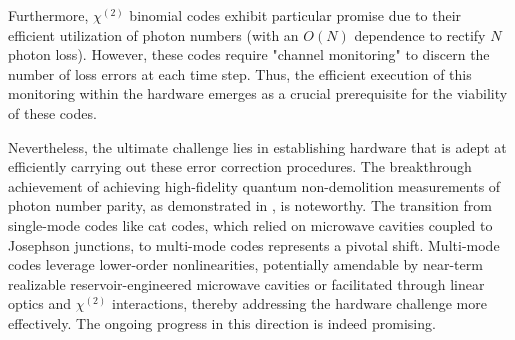 \documentclass[11pt]{article}
\newcommand\0{\mathbf{0}}
\newcommand\<{\langle}
\renewcommand\>{\rangle}
\begin{document}
Furthermore, $\chi^{(2)}$ binomial codes exhibit particular promise due to their efficient utilization of photon numbers (with an $O(N)$ dependence to rectify $N$ photon loss). However, these codes require "channel monitoring" to discern the number of loss errors at each time step. Thus, the efficient execution of this monitoring within the hardware emerges as a crucial prerequisite for the viability of these codes.

Nevertheless, the ultimate challenge lies in establishing hardware that is adept at efficiently carrying out these error correction procedures. The breakthrough achievement of achieving high-fidelity quantum non-demolition measurements of photon number parity, as demonstrated in \cite{sun2014tracking}, is noteworthy. The transition from single-mode codes like cat codes, which relied on microwave cavities coupled to Josephson junctions, to multi-mode codes represents a pivotal shift. Multi-mode codes leverage lower-order nonlinearities, potentially amendable by near-term realizable reservoir-engineered microwave cavities \cite{albert2018multimode} or facilitated through linear optics and $\chi^{(2)}$ interactions, thereby addressing the hardware challenge more effectively. The ongoing progress in this direction is indeed promising.

\nocite{*}
\newpage
\centering


\end{document}
